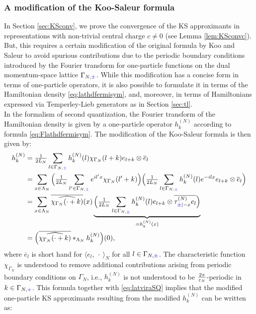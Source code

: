 \documentclass[a4paper, 11pt]{article}
\DeclareMathOperator{\1}{\mathds{1}}
\begin{document}
\subsubsection{A modification of the Koo-Saleur formula}
\label{sec:KSmod}
In Section \ref{sec:KSconv}, we prove the convergence of the KS approximants in representations with non-trivial central charge $c\neq0$ (see Lemma \ref{lem:KSconvc}). But, this requires a certain modification of the original formula by Koo and Saleur to avoid spurious contributions due to the periodic boundary conditions introduced by the Fourier transform for one-particle functions on the dual momentum-space lattice $\Gamma_{N,{\color{blue}\pm}}$. While this modification has a concise form in terms of one-particle operators, it is also possible to formulate it in terms of the Hamiltonian density \eqref{eq:lathdfermisym}, and, moreover, in terms of Hamiltonians expressed via Temperley-Lieb generators as in Section \ref{sec:tl}.\\
In the formalism of second quantization, the Fourier transform of the Hamiltonian density is given by a one-particle operator $h^{(N)}_{k}$ according to formula  \eqref{eq:Flathdfermisym}. The modification of the Koo-Saleur formula is then given by:
\begin{align}
\label{eq:hdmod1p}
h^{(N)}_{k} & = \tfrac{1}{2L_{N}}\sum_{l\in\Gamma_{N,{\color{blue}\pm}}}h^{(N)}_{k}(l)\chi_{\Gamma_{N}}(l+k)e_{l+k}\otimes \overline{e}_{l} \\ \nonumber
 & = \sum_{x\in\Lambda_{N}}\Big(\tfrac{1}{2L_{N}}\sum_{l'\in\Gamma_{N,{\color{blue}\pm}}}e^{il'x}\chi_{\Gamma_{N}}(l'+k)\Big)\Big(\tfrac{1}{2L_{N}}\sum_{l\in\Gamma_{N,{\color{blue}\pm}}}h^{(N)}_{k}(l)e^{-ilx}e_{l+k}\otimes \overline{e}_{l}\Big) \\ \nonumber
  & = \sum_{x\in\Lambda_{N}}\overline{\widehat{\chi_{\Gamma_{N}}(\cdot+k)}}(x)\underbrace{\Big(\tfrac{1}{2L_{N}}\sum_{l\in\Gamma_{N,{\color{blue}\pm}}}h^{(N)}_{k}(l)e_{l+k}\otimes \overline{\tau^{(N)}_{{\color{blue}\pm} |-x}e_{l}}\Big)}_{=h^{(N)}_{k}(x)} \\ \nonumber
  & = \Big(\overline{\widehat{\chi_{\Gamma_{N}}(\cdot+k)}}\ast_{\Lambda_{N}}h^{(N)}_{k}\Big)(0),
\end{align}
where $\overline{e}_{l}$ is short hand for $\langle e_{l},\!\ \cdot\!\ \rangle_{N}$ for all $l\in\Gamma_{N,{\color{blue}\pm}}$. The characteristic function $\chi_{\Gamma_{N}}$ is understood to remove additional contributions arising from periodic boundary conditions on $\Gamma_{N}$, i.e., $h^{(N)}_{k}$ is not understood to be $\tfrac{2\pi}{\varepsilon_{N}}$-periodic in $k\in\Gamma_{N,{\color{blue}+}}$. This formula together with \eqref{eq:latviraSQ} implies that the modified one-particle KS approximants resulting from the modified $h^{(N)}_{k}$ can be written as:
\end{document}
